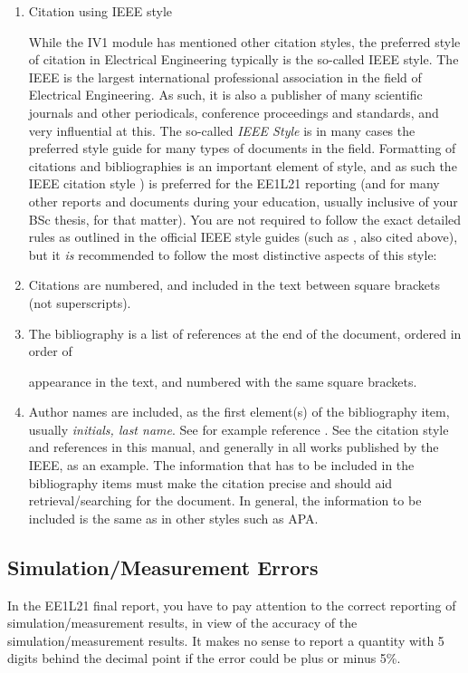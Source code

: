 \begin{enumerate}
\item  Citation using IEEE style

  While the IV1 module has mentioned other citation styles, the preferred style of citation in Electrical Engineering typically is the so-called IEEE style. The IEEE is the largest international professional association in the field of Electrical Engineering. As such, it is also a publisher of many scientific journals and other periodicals, conference proceedings and standards, and very influential at this. The so-called \textit{IEEE Style }is in many cases the preferred style guide for many types of documents in the field. Formatting of citations and bibliographies is an important element of style, and as such the IEEE citation style \cite{IEEE}) is preferred for the EE1L21 reporting (and for many other reports and documents during your education, usually inclusive of your BSc thesis, for that matter). You are not required to follow the exact detailed rules as outlined in the official IEEE style guides (such as \cite{IEEE}, also cited above), but it \textit{is} recommended to follow the most distinctive aspects of this style:


\item  Citations are numbered, and included in the text between square brackets (not superscripts).

\item  The bibliography is a list of references at the end of the document, ordered in order of


  appearance in the text, and numbered with the same square brackets.

\item  Author names are included, as the first element(s) of the bibliography item, usually \textit{initials, last name}. See for example reference \cite{Elling}. See the citation style and references in this manual, and generally in all works published by the IEEE, as an example. The information that has to be included in the bibliography items must make the citation precise and should aid retrieval/searching for the document. In general, the information to be included is the same as in other styles such as APA.

\end{enumerate}

  


\subsection{ Simulation/Measurement Errors}

  

  In the EE1L21 final report, you have to pay attention to the correct reporting of simulation/measurement results, in view of the accuracy of the simulation/measurement results. It makes no sense to report a quantity with 5 digits behind the decimal point if the error could be plus or minus 5\%.

  




